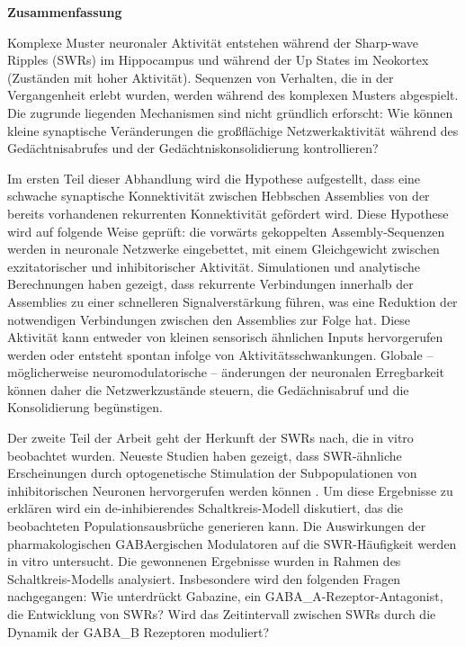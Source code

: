 \huge\textbf{Zusammenfassung}
\normalsize
\vspace{10mm}

Komplexe Muster neuronaler Aktivit\"{a}t entstehen w\"{a}hrend der Sharp-wave
Ripples (SWRs) im Hippocampus und w\"{a}hrend der Up States im Neokortex
(Zust\"{a}nden mit hoher Aktivit\"{a}t). Sequenzen von Verhalten, die in der
Vergangenheit erlebt wurden, werden w\"{a}hrend des komplexen Musters
abgespielt. Die zugrunde liegenden Mechanismen sind nicht gr\"{u}ndlich
erforscht: Wie k\"{o}nnen kleine synaptische Ver\"{a}nderungen die
gro{\ss}fl\"{a}chige Netzwerkaktivit\"{a}t w\"{a}hrend des
Ged\"{a}chtnisabrufes und der Ged\"{a}chtniskonsolidierung kontrollieren?

Im ersten Teil dieser Abhandlung wird die Hypothese aufgestellt, dass eine
schwache synaptische Konnektivit\"{a}t zwischen Hebbschen Assemblies von der
bereits vorhandenen rekurrenten Konnektivit\"{a}t gef\"{o}rdert wird. Diese
Hypothese wird auf folgende Weise gepr\"{u}ft: die vorw\"{a}rts gekoppelten
Assembly-Sequenzen werden in neuronale Netzwerke eingebettet, mit einem
Gleichgewicht zwischen exzitatorischer und inhibitorischer Aktivit\"{a}t.
Simulationen und analytische Berechnungen haben gezeigt, dass rekurrente
Verbindungen innerhalb der Assemblies zu einer schnelleren
Signalverst\"{a}rkung f\"{u}hren, was eine Reduktion der notwendigen
Verbindungen zwischen den Assemblies zur Folge hat. Diese Aktivit\"{a}t kann
entweder von kleinen sensorisch \"{a}hnlichen Inputs hervorgerufen werden oder
entsteht spontan infolge von Aktivit\"{a}tsschwankungen. Globale --
m\"{o}glicherweise neuromodulatorische -- \"{a}nderungen der neuronalen
Erregbarkeit k\"{o}nnen daher die Netzwerkzust\"{a}nde steuern, die
Ged\"{a}chnisabruf und die Konsolidierung beg\"{u}nstigen.

Der zweite Teil der Arbeit geht der Herkunft der SWRs nach, die in vitro
beobachtet wurden. Neueste Studien haben gezeigt, dass SWR-\"{a}hnliche
Erscheinungen durch optogenetische Stimulation der Subpopulationen von
inhibitorischen Neuronen hervorgerufen werden k\"{o}nnen
\citep{Schlingloff2014, Kohus2016}. Um diese Ergebnisse zu erkl\"{a}ren wird
ein de-inhibierendes Schaltkreis-Modell diskutiert, das die beobachteten
Populationsausbr\"{u}che generieren kann. Die Auswirkungen der
pharmakologischen GABAergischen Modulatoren auf die SWR-H\"{a}ufigkeit werden
in vitro untersucht. Die gewonnenen Ergebnisse wurden in Rahmen des
Schaltkreis-Modells analysiert. Insbesondere wird den folgenden Fragen
nachgegangen: Wie unterdr\"{u}ckt Gabazine, ein GABA_A-Rezeptor-Antagonist, die
Entwicklung von SWRs? Wird das Zeitintervall zwischen SWRs durch die Dynamik
der GABA_B Rezeptoren moduliert?

\newpage
